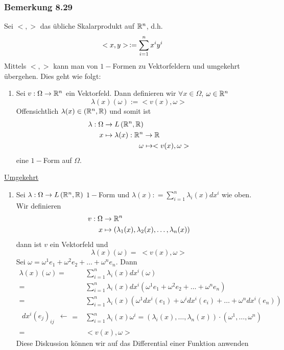 \subsubsection*{Bemerkung 8.29}
Sei $<,>$ das übliche Skalarprodukt auf $\mathbb{R}^n$, d.h. \[ < x,y >\, \vcentcolon= \sum\limits_{i = 1}^n {{x^i}{y^i}} \]
Mittels $<,>$ kann man von $1-$Formen zu Vektorfeldern und umgekehrt übergehen. Dies geht wie folgt:
\begin{enumerate}
\item Sei $v:\Omega\to\mathbb{R}^n$ ein Vektorfeld. Dann definieren wir $\forall x\in\Omega$, $\omega\in\mathbb{R}^n$
\[\lambda (x)(\omega):= < v(x),\omega >\] Offensichtlich $\lambda (x)\in\left( \mathbb{R}^n, \mathbb{R}\right)$ und somit ist
\begin{align*}
\lambda : \Omega &\to L\left(\R^n, \R\right) \\
x &\mapsto\lambda (x): \R^n \to\R\\
&\hspace{17.5mm}\omega \mapsto <v(x),\omega >
\end{align*}
eine $1-$Form auf $\Omega$.
\end{enumerate}
\underline{Umgekehrt}
\begin{enumerate}[\indent 2.]
\item Sei $\lambda :\Omega\to L\left(\mathbb{R}^n,\mathbb{R}\right)$ $1-$Form und $\lambda (x): = \sum\limits_{i = 1}^n {{\lambda _i}(x)d{x^i}} $ wie oben.\\

Wir definieren
\begin{align*}
v:\Omega &\to\mathbb{R}^n\\
x &\mapsto \left( \lambda _1(x),\lambda _2(x),\dots,\lambda _n(x) \right)
\end{align*}
dann ist $v$ ein Vektorfeld und \[\lambda (x)(\omega)= \;< v(x),\omega>\] Sei $\omega = \omega^1e_1+\omega^2 e_2 + \dots + \omega^n e_n$. Dann
\begin{align*}
\lambda (x)(\omega ) = & \sum\limits_{i = 1}^n {{\lambda _i}(x)d{x^i}(\omega )}\\
= & \sum\limits_{i = 1}^n {{\lambda _i}(x)d{x^i}\left( {{\omega ^1}{e_1} + {\omega ^2}{e_2} +  \ldots  + {\omega ^n}{e_n}} \right)}\\
 = & \sum\limits_{i = 1}^n {{\lambda _i}(x)\left( {{\omega ^1}d{x^i}\left( {{e_1}} \right) + {\omega ^i}d{x^i}\left( {{e_i}} \right) +  \ldots  + {\omega ^n}d{x^i}\left( {{e_n}} \right)} \right)} \\
\begin{array}{*{20}{c}}
{d{x^i}{{\left( {{e_j}} \right)}_{ij}}}& \leftarrow
\end{array} = & \sum\limits_{i = 1}^n {{\lambda _i}(x){\omega ^i}}  = \left( {{\lambda _i}(x), \ldots ,{\lambda _n}(x)} \right) \cdot \left( {{\omega ^1}, \ldots ,{\omega ^n}} \right)\\
 = & < v(x),\omega  >
\end{align*}
Diese Diskussion können wir auf das Differential einer Funktion anwenden
\end{enumerate}

